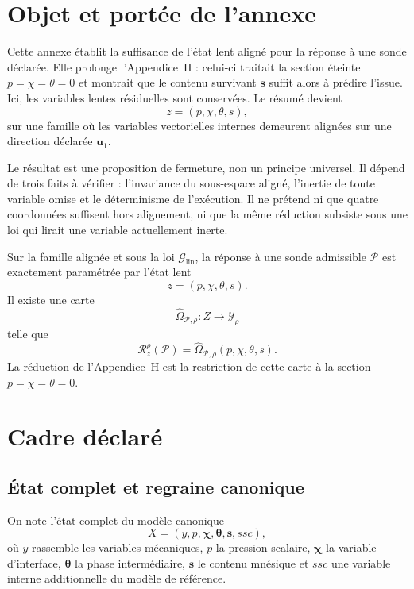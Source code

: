 \section{Objet et portée de l'annexe}
\label{annexe-I-objet}

Cette annexe établit la suffisance de l'état lent aligné pour la réponse
à une sonde déclarée. Elle prolonge l'Appendice~H : celui-ci traitait la
section éteinte $p=\chi=\theta=0$ et montrait que le contenu survivant
$\mathbf s$ suffit alors à prédire l'issue. Ici, les variables lentes
résiduelles sont conservées. Le résumé devient
\[
z=(p,\chi,\theta,s),
\]
sur une famille où les variables vectorielles internes demeurent
alignées sur une direction déclarée $\mathbf u_1$.

Le résultat est une proposition de fermeture, non un principe universel.
Il dépend de trois faits à vérifier : l'invariance du sous-espace aligné,
l'inertie de toute variable omise et le déterminisme de l'exécution. Il
ne prétend ni que quatre coordonnées suffisent hors alignement, ni que
la même réduction subsiste sous une loi qui lirait une variable
actuellement inerte.

\begin{encadre}[title={Résultat directeur}]
Sur la famille alignée et sous la loi $\mathcal G_{\mathrm{lin}}$, la
réponse à une sonde admissible $\mathcal P$ est exactement paramétrée
par l'état lent
\[
z=(p,\chi,\theta,s).
\]
Il existe une carte
\[
\widehat\Omega_{\mathcal P,\rho}:Z\longrightarrow\mathcal Y_\rho
\]
telle que
\[
\mathcal R_z^\rho(\mathcal P)
=
\widehat\Omega_{\mathcal P,\rho}(p,\chi,\theta,s).
\]
La réduction de l'Appendice~H est la restriction de cette carte à la
section $p=\chi=\theta=0$.
\end{encadre}

\section{Cadre déclaré}
\label{annexe-I-cadre}

\subsection{État complet et regraine canonique}
\label{annexe-I-etat-complet}

On note l'état complet du modèle canonique
\[
X=(y,p,\boldsymbol\chi,\boldsymbol\theta,\mathbf s,ssc),
\]
où $y$ rassemble les variables mécaniques, $p$ la pression scalaire,
$\boldsymbol\chi$ la variable d'interface, $\boldsymbol\theta$ la phase
intermédiaire, $\mathbf s$ le contenu mnésique et $ssc$ une variable
interne additionnelle du modèle de référence.

